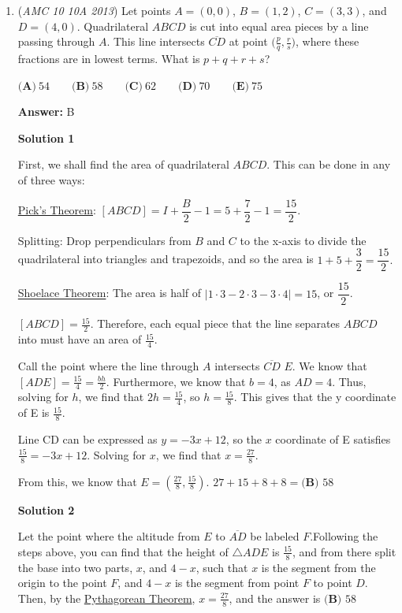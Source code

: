 \begin{enumerate}
 


	\item (\textit{AMC 10 10A 2013}) Let points $A = (0, 0)$, $B = (1, 2)$, $C=(3, 3)$, and $D = (4, 0)$.  Quadrilateral $ABCD$ is cut into equal area pieces by a line passing through $A$.  This line intersects $\overline{CD}$ at point $\bigg(\frac{p}{q}, \frac{r}{s}\bigg)$, where these fractions are in lowest terms.  What is $p+q+r+s$?


 $\textbf{(A)}\ 54\qquad\textbf{(B)}\ 58\qquad\textbf{(C)}\ 62\qquad\textbf{(D)}\ 70\qquad\textbf{(E)}\ 75$

 \textbf{Answer: }B



\textbf{Solution 1}

First, we shall find the area of quadrilateral $ABCD$. This can be done in any of three ways:

 \href{https://artofproblemsolving.com/wiki/index.php?title=Pick\%27s\_Theorem}{Pick's Theorem}: $[ABCD] = I + \dfrac{B}{2} - 1 = 5 + \dfrac{7}{2} - 1 = \dfrac{15}{2}.$

 Splitting: Drop perpendiculars from $B$ and $C$ to the x-axis to divide the quadrilateral into triangles and trapezoids, and so the area is $1 + 5 + \dfrac{3}{2} = \dfrac{15}{2}.$

 \href{https://artofproblemsolving.com/wiki/index.php?title=Shoelace\_Theorem}{Shoelace Theorem}: The area is half of $|1 \cdot 3 - 2 \cdot 3 - 3 \cdot 4| = 15$, or $\dfrac{15}{2}$.

 $[ABCD] = \frac{15}{2}$.  Therefore, each equal piece that the line separates $ABCD$ into must have an area of $\frac{15}{4}$.

 Call the point where the line through $A$ intersects $\overline{CD}$ $E$.  We know that $[ADE] = \frac{15}{4} = \frac{bh}{2}$.  Furthermore, we know that $b = 4$, as $AD = 4$.  Thus, solving for $h$, we find that $2h = \frac{15}{4}$, so $h = \frac{15}{8}$.  This gives that the y coordinate of E is $\frac{15}{8}$.  

 Line CD can be expressed as $y = -3x+12$, so the $x$ coordinate of E satisfies $\frac{15}{8} = -3x + 12$.  Solving for $x$, we find that $x = \frac{27}{8}$.

 From this, we know that $E = \left(\frac{27}{8}, \frac{15}{8}\right)$.  $27 + 15 + 8 + 8 = \boxed{\textbf{(B) }58}$




\textbf{Solution 2}

Let the point where the altitude from $E$ to $\overline{AD}$ be labeled $F$.Following the steps above, you can find that the height of $\triangle ADE$ is $\frac{15}{8}$, and from there split the base into two parts, $x$, and $4-x$, such that $x$ is the segment from the origin to the point $F$, and $4-x$ is the segment from point $F$ to point $D$. Then, by the \href{https://artofproblemsolving.com/wiki/index.php?title=Pythagorean\_Theorem}{Pythagorean Theorem}, $x=\frac{27}{8}$, and the answer is $\boxed{\textbf{(B) }58}$




\end{enumerate}
